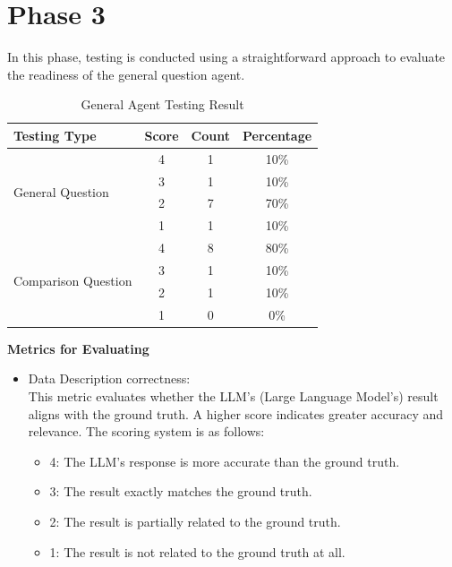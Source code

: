 \section{Phase 3}
    In this phase, testing is conducted using a straightforward approach to evaluate the readiness of the general question agent.
    \begin{table}[H]
      \centering
      \caption{General Agent Testing Result}
      \label{tbl:general-agent-testing-result}
      \begin{tabular}{|l|c|c|c|}
        \hline
        \textbf{Testing Type} & \textbf{Score} & \textbf{Count} & \textbf{Percentage} \\
        \hline
        \multirow{4}{*}{General Question}
                  & 4 & 1 & 10\% \\
                  & 3 & 1 & 10\% \\
                  & 2 & 7 & 70\% \\
                  & 1 & 1 & 10\% \\
        \hline
        \multirow{4}{*}{Comparison Question}
                  & 4 & 8 & 80\% \\
                  & 3 & 1 & 10\% \\
                  & 2 & 1 & 10\% \\
                  & 1 & 0 & 0\% \\
        \hline
      \end{tabular}
    \end{table}
    \textbf{Metrics for Evaluating}
    \begin{itemize}
      \item Data Description correctness: \\ This metric evaluates whether the LLM’s (Large Language Model’s) result aligns with the ground truth. A higher score indicates greater accuracy and relevance. The scoring system is as follows:
      \begin{itemize}
        \item 4: The LLM's response is more accurate than the ground truth.
        \item 3: The result exactly matches the ground truth.
        \item 2: The result is partially related to the ground truth.
        \item 1: The result is not related to the ground truth at all.
      \end{itemize}
    \end{itemize}
